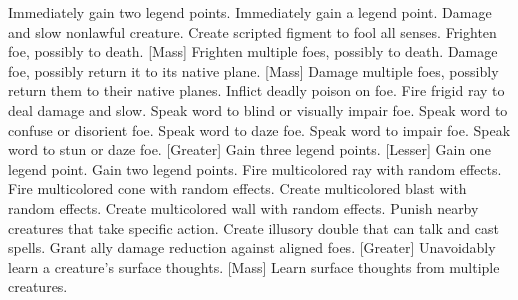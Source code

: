     {Immediately gain two legend points.}
    {Immediately gain a legend point.}
    {Damage and slow nonlawful creature.}
    {Create scripted figment to fool all senses.}
    {Frighten foe, possibly to death.}
[Mass]
    {Frighten multiple foes, possibly to death.}
    {Damage foe, possibly return it to its native plane.}
[Mass]
    {Damage multiple foes, possibly return them to their native planes.}
    {Inflict deadly poison on foe.}
    {Fire frigid ray to deal damage and slow.}
    {Speak word to blind or visually impair foe.}
    {Speak word to confuse or disorient foe.}
    {Speak word to daze foe.}
    {Speak word to impair foe.}
    {Speak word to stun or daze foe.}
[Greater]
    {Gain three legend points.}
[Lesser]
    {Gain one legend point.}
    {Gain two legend points.}
    {Fire multicolored ray with random effects.}
    {Fire multicolored cone with random effects.}
    {Create multicolored blast with random effects.}
    {Create multicolored wall with random effects.}
    {Punish nearby creatures that take specific action.}
    {Create illusory double that can talk and cast spells.}
    {Grant ally damage reduction against aligned foes.}
[Greater]
    {Unavoidably learn a creature's surface thoughts.}
[Mass]
    {Learn surface thoughts from multiple creatures.}
